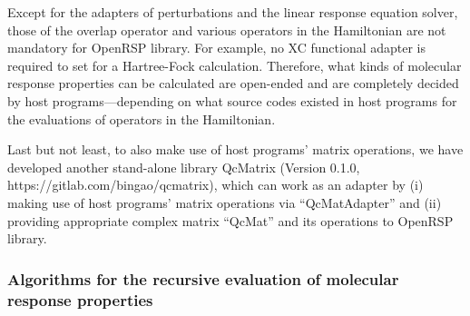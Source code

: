 \documentclass[%
 reprint,
 amsmath,amssymb,
 aps,
]{revtex4-1}
\begin{document}
Except for the adapters of perturbations and the linear response equation
solver, those of the overlap operator and various operators in the Hamiltonian
are not mandatory for OpenRSP library. For example, no XC functional adapter is
required to set for a Hartree-Fock calculation. Therefore, what kinds of
molecular response properties can be calculated are open-ended and are
completely decided by host programs---depending on what source codes existed in
host programs for the evaluations of operators in the Hamiltonian.

Last but not least, to also make use of host programs' matrix operations, we
have developed another stand-alone library QcMatrix (Version 0.1.0,
https://gitlab.com/bingao/qcmatrix), which can work as an adapter by (i) making
use of host programs' matrix operations via ``QcMatAdapter'' and (ii) providing
appropriate complex matrix ``QcMat'' and its operations to OpenRSP library.

\subsubsection{Algorithms for the recursive evaluation of molecular response properties}
\label{subsubsection-recursive-algorithms}
\end{document}
